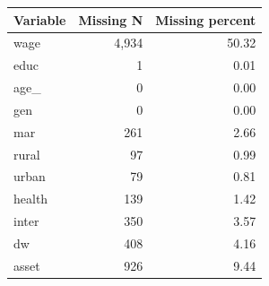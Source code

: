 \begin{tabular}{lrr}
\toprule
Variable & Missing N & Missing percent \\
\midrule
wage & 4,934 & 50.32 \\
educ & 1 & 0.01 \\
age\_ & 0 & 0.00 \\
gen & 0 & 0.00 \\
mar & 261 & 2.66 \\
rural & 97 & 0.99 \\
urban & 79 & 0.81 \\
health & 139 & 1.42 \\
inter & 350 & 3.57 \\
dw & 408 & 4.16 \\
asset & 926 & 9.44 \\
\bottomrule
\end{tabular}
